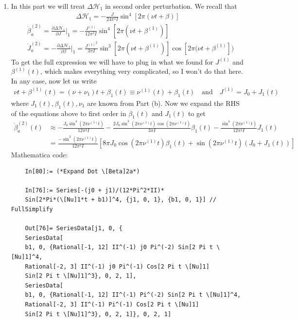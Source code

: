 \documentclass{article}
\theoremstyle{definition}
\newcommand{\p}{\partial}
\newcommand{\ham}{\mathcal{H}}
\newcommand{\be}{\beta}
\newcommand{\f}[2]{\frac{#1}{#2}}
\newcommand{\lp}{\left(}
\newcommand{\rp}{\right)}
\newcommand{\lb}{\left[}
\newcommand{\rb}{\right]}
\begin{document}
\begin{enumerate}[label=(\alph*)]
	\item In this part we will treat $\Delta \ham_1$ in second order perturbation. We recall that
	\begin{align*}
	\Delta \ham_1 = -\f{J}{24\pi^2 I } \sin^4[2\pi(\nu t + \be)]
	\end{align*}
	\begin{align*}
	&\dot \be^{(2)}_a = \f{\p \Delta \ham_1}{\p J}\bigg\vert_1 = \boxed{{- \f{J^{(1)}}{12\pi^2 I } \sin^4\lb 2\pi( \nu t + \be^{(1)})\rb}}\\
	&\dot J^{(2)}_a = -\f{\p \Delta \ham_1}{\p \be} \bigg\vert_1 = \boxed{{\f{{J^{(1)}}^2}{3\pi I} \sin^3\lb 2\pi\lp \nu t + \be^{(1)}\rp \rb \cos\lb 2\pi(\nu t + \be^{(1)}\rb )}}
	\end{align*}
	To get the full expression we will have to plug in what we found for $J^{(1)}$ and $\be^{(1)}(t)$, which makes everything very complicated, so I won't do that here. In any case, now let us write
	\begin{align*}
	\nu t + \be^{(1)}(t) = (\nu + \nu_1)t + \be_1(t) \equiv \nu^{(1)}(t) + \be_1(t) \quad\text{and}\quad J^{(1)} = J_0 + J_1(t)
	\end{align*}
	where $J_1(t), \be_1(t),\nu_1$  are known from Part (b). Now we expand the RHS of the equations above to first order in $\be_1(t)$ and $J_1(t)$ to get
	\begin{align*}
	\dot \be_a^{(2)}(t) 
	&\approx 
	-\frac{J_0 \sin^4(2 \pi  \nu^{(1)} t)}{12 \pi ^2 I}
	-\frac{2  J_0 \sin^3(2 \pi  \nu^{(1)} t) \cos (2 \pi \nu^{(1)} t)}{3 \pi I}  \be_1(t)
	-\frac{\sin^4(2 \pi \nu^{(1)} t)}{12 \pi ^2 I} J_1(t)  \\
	&= \f{-\sin ^3(2 \pi  \nu^{(1)} t)}{12 \pi^2 I }\lb  8 \pi J_0  \cos (2 \pi 
		\nu^{(1)} t)  \be_1(t)  +\sin (2 \pi  \nu^{(1)} t)  (J_0+ J_1(t))  \rb
	\end{align*}
	Mathematica code:
	\begin{lstlisting}
	In[80]:= (*Expand Dot \[Beta]2a*)
	
	In[76]:= Series[-(j0 + j1)/(12*Pi^2*II)*
	Sin[2*Pi*(\[Nu]1*t + b1)]^4, {j1, 0, 1}, {b1, 0, 1}] // FullSimplify
	
	Out[76]= SeriesData[j1, 0, {
	SeriesData[
	b1, 0, {Rational[-1, 12] II^(-1) j0 Pi^(-2) Sin[2 Pi t \[Nu]1]^4, 
	Rational[-2, 3] II^(-1) j0 Pi^(-1) Cos[2 Pi t \[Nu]1]
	Sin[2 Pi t \[Nu]1]^3}, 0, 2, 1], 
	SeriesData[
	b1, 0, {Rational[-1, 12] II^(-1) Pi^(-2) Sin[2 Pi t \[Nu]1]^4, 
	Rational[-2, 3] II^(-1) Pi^(-1) Cos[2 Pi t \[Nu]1]
	Sin[2 Pi t \[Nu]1]^3}, 0, 2, 1]}, 0, 2, 1]
	

\end{lstlisting}
\end{enumerate}
\end{document}

